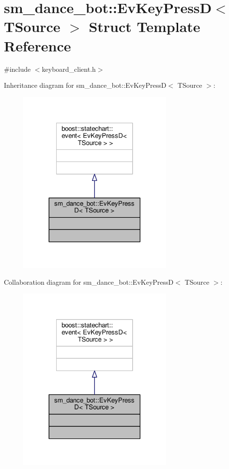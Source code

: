 \hypertarget{structsm__dance__bot_1_1EvKeyPressD}{}\section{sm\+\_\+dance\+\_\+bot\+:\+:Ev\+Key\+PressD$<$ T\+Source $>$ Struct Template Reference}
\label{structsm__dance__bot_1_1EvKeyPressD}


{\ttfamily \#include $<$keyboard\+\_\+client.\+h$>$}



Inheritance diagram for sm\+\_\+dance\+\_\+bot\+:\+:Ev\+Key\+PressD$<$ T\+Source $>$\+:
\nopagebreak
\begin{figure}[H]
\begin{center}
\leavevmode
\includegraphics[width=221pt]{structsm__dance__bot_1_1EvKeyPressD__inherit__graph}
\end{center}
\end{figure}


Collaboration diagram for sm\+\_\+dance\+\_\+bot\+:\+:Ev\+Key\+PressD$<$ T\+Source $>$\+:
\nopagebreak
\begin{figure}[H]
\begin{center}
\leavevmode
\includegraphics[width=221pt]{structsm__dance__bot_1_1EvKeyPressD__coll__graph}
\end{center}
\end{figure}


